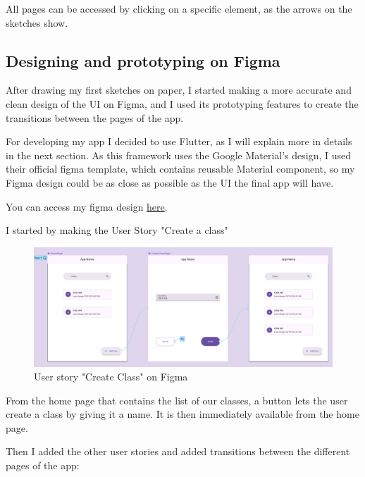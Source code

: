 \documentclass[]{article}
\begin{document}
	All pages can be accessed by clicking on a specific element, as the arrows on the sketches show.
	
	\pagebreak
	
	\subsection{Designing and prototyping on Figma}
	
	After drawing my first sketches on paper, I started making a more accurate and clean design of the UI on Figma, and I used its prototyping features to create the transitions between the pages of the app.
	
	For developing my app I decided to use Flutter, as I will explain more in details in the next section.
	As this framework uses the Google Material's design, I used their official figma template, which contains reusable Material component, so my Figma design could be as close as possible as the UI the final app will have.
	
	
	You can access my figma design \href{https://www.figma.com/file/ZOlxVGHb9fLdk5uUODqMU9/CSCI-337---Notes-Taking-App?type=design&node-id=54810%3A34721&mode=design&t=fS6KJvRgsvtgz9cf-1}{here}.
	
	I started by making the User Story "Create a class"
	
		\begin{figure}[!htb]
		\centering
		\includegraphics[scale=0.3]{figma_user_story_create_class}
		\caption{User story "Create Class" on Figma}
	\end{figure}
	
	From the home page that contains the list of our classes, a button lets the user create a class by giving it a name. It is then immediately available from the home page.
	
	\pagebreak
	
	Then I added the other user stories and added transitions between the different pages of the app:
	
\end{document}
